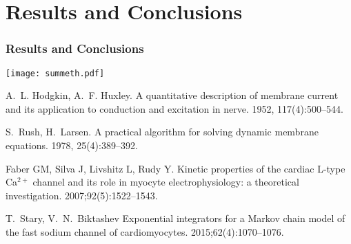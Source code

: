 \documentclass[compress]{beamer}
\begin{document}
\section{Results and Conclusions}

\begin{frame}
  \frametitle{Results and Conclusions}
  \texttt{[image: summeth.pdf]}

      \begin{itemize}
      \end{itemize}
\end{frame}


\begin{frame}
\begin{thebibliography}{1}

A.~L. Hodgkin, A.~F. Huxley.
\newblock A quantitative description of membrane current and its application to
  conduction and excitation in nerve.
 1952, 117(4):500--544.

S.~Rush, H.~Larsen.
\newblock A practical algorithm for solving dynamic membrane equations.
 1978, 25(4):389--392.

  Faber GM, Silva J, Livshitz L, Rudy Y.
  \newblock Kinetic properties of the cardiac {L}-type {Ca$^{2+}$} channel and
  its role in myocyte electrophysiology: a theoretical investigation.
   2007;\hspace{0pt}92(5):1522--1543.

  T.~Stary, V.~N.~Biktashev
  \newblock Exponential integrators for a Markov chain model of the fast sodium
  channel of cardiomyocytes.
   2015;\hspace{0pt}62(4):1070--1076.

\end{thebibliography}
  
\end{frame}
\end{document}
